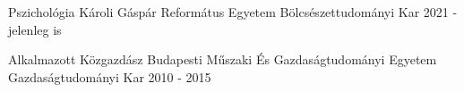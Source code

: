 

\begin{cventries}

   \cventry
    {Pszichológia} %
    {Károli Gáspár Református Egyetem} %
    {Bölcsészettudományi Kar} %
    {2021 - jelenleg is} %
    {
    } 
  \vspace{-2.0mm}
  
  \cventry
    {Alkalmazott Közgazdász} %
    {Budapesti Műszaki És Gazdaságtudományi Egyetem} %
    {Gazdaságtudományi Kar} %
    {2010 - 2015} %
    {
    }
  \vspace{-2.0mm}
  
\end{cventries}

